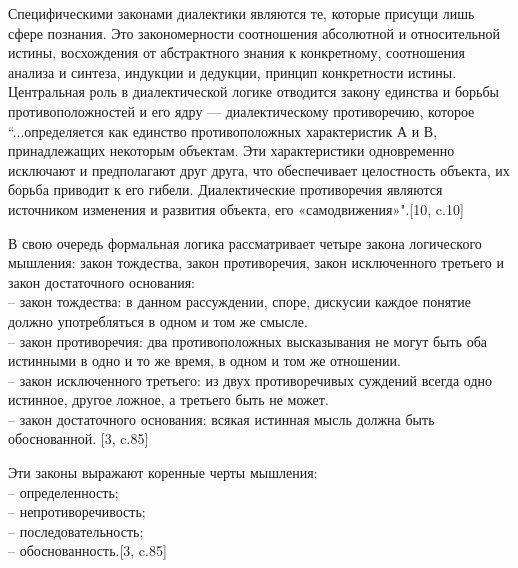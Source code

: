 \documentclass[a4paper,12pt]{report}
\begin{document}
	 Специфическими законами диалектики являются те, которые присущи лишь сфере познания. Это закономерности соотношения абсолютной и относительной истины, восхождения от абстрактного знания к конкретному, соотношения анализа и синтеза, индукции и дедукции, принцип конкретности истины. Центральная роль  в диалектической логике отводится закону единства и борьбы противоположностей и его ядру — диалектическому противоречию, которое   “...определяется как единство противоположных характеристик А и В, принадлежащих некоторым объектам. Эти характеристики одновременно исключают и предполагают друг друга, что обеспечивает целостность объекта, их борьба приводит к его гибели. Диалектические противоречия являются источником изменения и развития объекта, его «самодвижения»".[10, c.10] 

В свою очередь формальная логика рассматривает четыре закона логического мышления: закон тождества, закон противоречия, закон исключенного третьего и закон достаточного основания:\\
\hspace*{0.7cm} – закон тождества: в данном рассуждении, споре, дискусии каждое понятие должно употребляться в одном и том же смысле.\\
\hspace*{0.7cm} – закон противоречия: два противоположных высказывания не могут быть оба истинными в одно и то же время, в одном и том же отношении.\\
\hspace*{0.7cm}– закон исключенного третьего: из двух противоречивых суждений всегда одно истинное, другое ложное, а третьего быть не может.\\
\hspace*{0.7cm}– закон достаточного основания: всякая истинная мысль должна быть обоснованной. [3, c.85]

Эти законы выражают коренные черты мышления: \\
\hspace*{0.7cm} – определенность; \\
\hspace*{0.7cm} – непротиворечивость; \\
\hspace*{0.7cm} – последовательность; \\
\hspace*{0.7cm} – обоснованность.[3, c.85]\\
\end{document}
